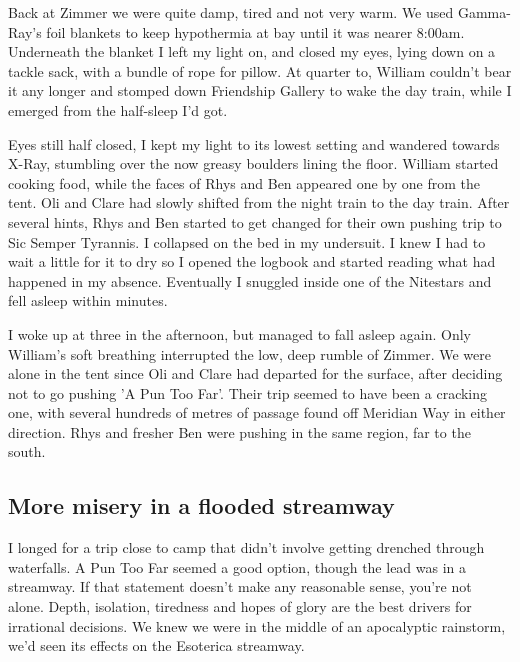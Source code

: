 Back at Zimmer we were quite damp, tired and not very warm. We used Gamma-Ray's foil blankets to keep hypothermia at bay until it was nearer 8:00am. Underneath the blanket I left my light on, and closed my eyes, lying down on a tackle sack, with a bundle of rope for pillow. At quarter to, William couldn't bear it any longer and stomped down Friendship Gallery to wake the day train, while I emerged from the half-sleep I'd got. 

Eyes still half closed, I kept my light to its lowest setting and wandered towards X-Ray, stumbling over the now greasy boulders lining the floor. William started cooking food, while the faces of Rhys and Ben appeared one by one from the tent. Oli and Clare had slowly shifted from the night train to the day train. After several hints, Rhys and Ben started to get changed for their own pushing trip to Sic Semper Tyrannis. I collapsed on the bed in my undersuit. I knew I had to wait a little for it to dry so I opened the logbook and started reading what had happened in my absence. Eventually I snuggled inside one of the Nitestars and fell asleep within minutes.

I woke up at three in the afternoon, but managed to fall asleep again. Only William's soft breathing interrupted the low, deep rumble of Zimmer. We were alone in the tent since Oli and Clare had departed for the surface, after deciding not to go pushing 'A Pun Too Far'. Their trip seemed to have been a cracking one, with several hundreds of metres of passage found off Meridian Way in either direction. Rhys and fresher Ben were pushing in the same region, far to the south.

\subsection{More misery in a flooded streamway}
\begin{marginfigure}
\end{marginfigure}
I longed for a trip close to camp that didn't involve getting drenched through waterfalls. A Pun Too Far seemed a good option, though the lead was in a streamway. If that statement doesn't make any reasonable sense, you're not alone. Depth, isolation, tiredness and hopes of glory are the best drivers for irrational decisions. We knew we were in the middle of an apocalyptic rainstorm, we'd seen its effects on the Esoterica streamway. 

